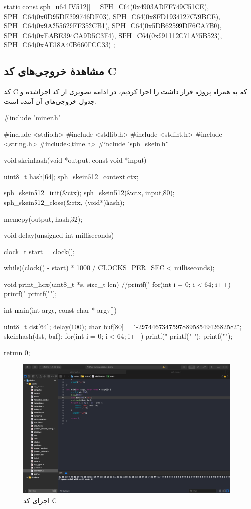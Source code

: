 \begin{ccode}
static const sph_u64 IV512[] = {
	SPH_C64(0x4903ADFF749C51CE), SPH_C64(0x0D95DE399746DF03),
	SPH_C64(0x8FD1934127C79BCE), SPH_C64(0x9A255629FF352CB1),
	SPH_C64(0x5DB62599DF6CA7B0), SPH_C64(0xEABE394CA9D5C3F4),
	SPH_C64(0x991112C71A75B523), SPH_C64(0xAE18A40B660FCC33)
};
\end{ccode}
\pagebreak
\subsection{مشاهدهٔ خروجی‌های کد C}
کد C که به همراه پروژه قرار داشت را اجرا کردیم، در ادامه تصویری از کد اجراشده و جدول خروجی‌های آن آمده است. 
\begin{ccode}
#include "miner.h"

#include <stdio.h>
#include <stdlib.h>
#include <stdint.h>
#include <string.h>
#include<time.h>
#include "sph_skein.h"


 void skeinhash(void *output, const void *input)
{
	uint8_t hash[64];
	sph_skein512_context ctx;
	
	sph_skein512_init(&ctx);
	sph_skein512(&ctx, input,80);
	sph_skein512_close(&ctx, (void*)hash);

	
	memcpy(output, hash,32);
}

void delay(unsigned int milliseconds){
    
    clock_t start = clock();
    
    while((clock() - start) * 1000 / CLOCKS_PER_SEC < milliseconds);
}

void print_hex(uint8_t *s, size_t len) {
    //printf("%
    for(int i = 0; i < 64; i++) {
        printf("%
    }
    printf("\n");
}

int main(int argc, const char * argv[]) {
    uint8_t dst[64];
    delay(100);
    char buf[80] = "-29744673475978895854942682582";
    skeinhash(dst, buf);
    for(int i = 0; i < 64; i++) {
        printf("%
        printf(" ");
    }
      printf("\n");
  
    return 0;
}
\end{ccode}
\pagebreak
\begin{figure}[H]
\includegraphics[width= \textwidth]{figs/simulation/output1.png}
\caption{اجرای کد C}
\label{c_output_1}
\end{figure}



